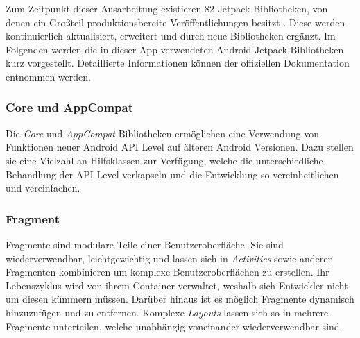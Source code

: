 Zum Zeitpunkt dieser Ausarbeitung existieren 82 Jetpack Bibliotheken, von denen ein Großteil produktionsbereite Veröffentlichungen besitzt \autocite{jetpackcount}.
Diese werden kontinuierlich aktualisiert, erweitert und durch neue Bibliotheken ergänzt.
Im Folgenden werden die in dieser App verwendeten Android Jetpack Bibliotheken kurz vorgestellt. Detaillierte Informationen können der offiziellen Dokumentation entnommen werden.

\subsubsection{Core und AppCompat}
\label{subsubsec:app:jetpack:base}
Die \textit{Core} und \textit{AppCompat} Bibliotheken ermöglichen eine Verwendung von Funktionen neuer Android API Level auf älteren Android Versionen.
Dazu stellen sie eine Vielzahl an Hilfsklassen zur Verfügung, welche die unterschiedliche Behandlung der API Level verkapseln und die Entwicklung so vereinheitlichen und vereinfachen.

\subsubsection{Fragment}
\label{subsubsec:app:jetpack:fragment}
Fragmente sind modulare Teile einer Benutzeroberfläche.
Sie sind wiederverwendbar, leichtgewichtig und lassen sich in \textit{Activities} sowie anderen Fragmenten kombinieren um komplexe Benutzeroberflächen zu erstellen.
Ihr Lebenszyklus wird von ihrem Container verwaltet, weshalb sich Entwickler nicht um diesen kümmern müssen.
Darüber hinaus ist es möglich Fragmente dynamisch hinzuzufügen und zu entfernen.
Komplexe \textit{Layouts} lassen sich so in mehrere Fragmente unterteilen, welche unabhängig voneinander wiederverwendbar sind.

